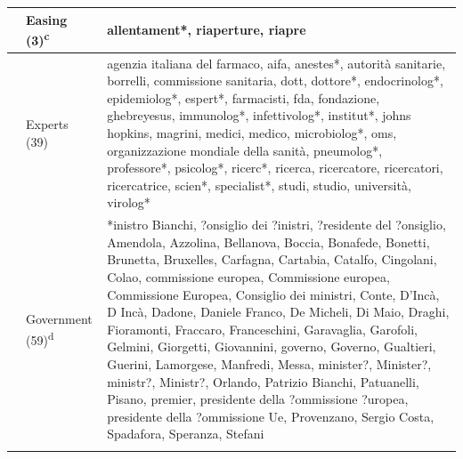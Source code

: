 \documentclass[
]{ccr}
\begin{document}
{\begin{spacing}{.9}
\begin{longtable}[]{@{}
  >{\raggedright\arraybackslash}p{.09\linewidth}
  >{\raggedright\arraybackslash}p{.12\linewidth}
  >{\raggedright\arraybackslash}p{.71\linewidth}@{}}
& Easing (3)\textsuperscript{c} & allentament*, riaperture, riapre \\ \cline{2-3}

& Experts (39) & agenzia italiana del farmaco, aifa, anestes*, autorità
sanitarie, borrelli, commissione sanitaria, dott, dottore*,
endocrinolog*, epidemiolog*, espert*, farmacisti, fda, fondazione,
ghebreyesus, immunolog*, infettivolog*, institut*, johns hopkins,
magrini, medici, medico, microbiolog*, oms, organizzazione mondiale
della sanità, pneumolog*, professore*, psicolog*, ricerc*, ricerca,
ricercatore, ricercatori, ricercatrice, scien*, specialist*, studi,
studio, università, virolog* \\ \cline{2-3}

& Government (59)\textsuperscript{d} & *inistro Bianchi, ?onsiglio dei
?inistri, ?residente del ?onsiglio, Amendola, Azzolina, Bellanova,
Boccia, Bonafede, Bonetti, Brunetta, Bruxelles, Carfagna, Cartabia,
Catalfo, Cingolani, Colao, commissione europea, Commissione europea,
Commissione Europea, Consiglio dei ministri, Conte, D'Incà, D Incà,
Dadone, Daniele Franco, De Micheli, Di Maio, Draghi, Fioramonti,
Fraccaro, Franceschini, Garavaglia, Garofoli, Gelmini, Giorgetti,
Giovannini, governo, Governo, Gualtieri, Guerini, Lamorgese, Manfredi,
Messa, minister?, Minister?, ministr?, Ministr?, Orlando, Patrizio
Bianchi, Patuanelli, Pisano, premier, presidente della ?ommissione
?uropea, presidente della ?ommissione Ue, Provenzano, Sergio Costa,
Spadafora, Speranza, Stefani \\ \cline{1-3}


\end{longtable}
\end{spacing}}
\end{document}
